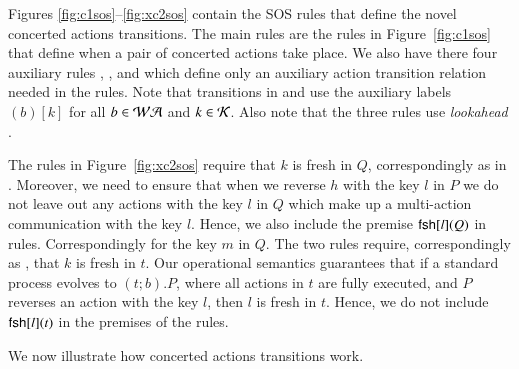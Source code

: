 {Figures \ref{fig:c1sos}--\ref{fig:xc2sos} contain the SOS rules that define the novel concerted actions transitions. 
The main rules are the  rules in Figure~\ref{fig:c1sos} that define when a pair %
of concerted actions take place. 
We also have there four auxiliary rules , ,  and  which 
define only an auxiliary action transition relation needed in the  rules.
Note that transitions in  and  use the auxiliary labels $(b)[k]$ 
for all $b \in \mathcal{WA}$ and $k \in \mathcal{K}$. Also note that the three  rules use \emph{lookahead} \cite{Uli92}.



The rules  in Figure~\ref{fig:xc2sos} require that $k$ is fresh in $Q$,
correspondingly as in . Moreover, we need to ensure that when we reverse $h$ with the key $l$
in $P$ we do not leave out any actions with the key $l$ in $Q$ which make up a multi-action 
communication with the key $l$. Hence, we also include the premise $\mathsf{fsh}[l](Q)$ in  rules. Correspondingly for the key $m$ in $Q$.
The two rules  require, correspondingly as , that $k$ is fresh in $t$.
Our operational semantics guarantees that if a standard process evolves to $(t;b).P$, where all actions in $t$ are fully executed, and
$P$ reverses an action with the key $l$, then $l$ is fresh in $t$. Hence, we do not include $\mathsf{fsh}[l](t)$
in the premises of the  rules.

We now illustrate how concerted actions transitions work.

}
